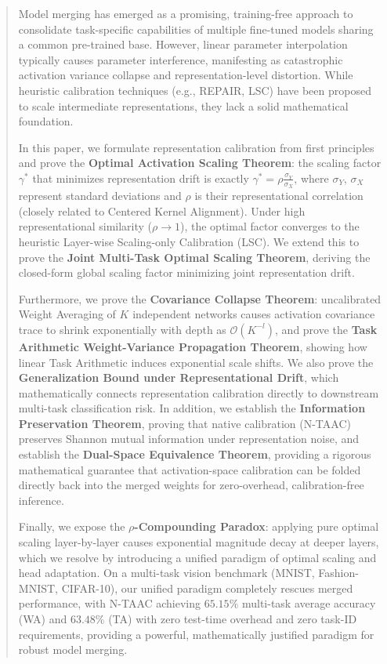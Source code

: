 \documentclass{article}
\theoremstyle{plain}
\theoremstyle{definition}
\theoremstyle{remark}
\begin{document}
\begin{abstract}
Model merging has emerged as a promising, training-free approach to consolidate task-specific capabilities of multiple fine-tuned models sharing a common pre-trained base. However, linear parameter interpolation typically causes parameter interference, manifesting as catastrophic activation variance collapse and representation-level distortion. While heuristic calibration techniques (e.g., REPAIR, LSC) have been proposed to scale intermediate representations, they lack a solid mathematical foundation.

In this paper, we formulate representation calibration from first principles and prove the \textbf{Optimal Activation Scaling Theorem}: the scaling factor $\gamma^*$ that minimizes representation drift is exactly $\gamma^* = \rho \frac{\sigma_Y}{\sigma_X}$, where $\sigma_Y$, $\sigma_X$ represent standard deviations and $\rho$ is their representational correlation (closely related to Centered Kernel Alignment). Under high representational similarity ($\rho \to 1$), the optimal factor converges to the heuristic Layer-wise Scaling-only Calibration (LSC). We extend this to prove the \textbf{Joint Multi-Task Optimal Scaling Theorem}, deriving the closed-form global scaling factor minimizing joint representation drift.

Furthermore, we prove the \textbf{Covariance Collapse Theorem}: uncalibrated Weight Averaging of $K$ independent networks causes activation covariance trace to shrink exponentially with depth as $\mathcal{O}(K^{-l})$, and prove the \textbf{Task Arithmetic Weight-Variance Propagation Theorem}, showing how linear Task Arithmetic induces exponential scale shifts. We also prove the \textbf{Generalization Bound under Representational Drift}, which mathematically connects representation calibration directly to downstream multi-task classification risk. In addition, we establish the \textbf{Information Preservation Theorem}, proving that native calibration (N-TAAC) preserves Shannon mutual information under representation noise, and establish the \textbf{Dual-Space Equivalence Theorem}, providing a rigorous mathematical guarantee that activation-space calibration can be folded directly back into the merged weights for zero-overhead, calibration-free inference.

Finally, we expose the \textbf{$\rho$-Compounding Paradox}: applying pure optimal scaling layer-by-layer causes exponential magnitude decay at deeper layers, which we resolve by introducing a unified paradigm of optimal scaling and head adaptation. On a multi-task vision benchmark (MNIST, Fashion-MNIST, CIFAR-10), our unified paradigm completely rescues merged performance, with N-TAAC achieving $65.15\%$ multi-task average accuracy (WA) and $63.48\%$ (TA) with zero test-time overhead and zero task-ID requirements, providing a powerful, mathematically justified paradigm for robust model merging.
\end{abstract}
\end{document}
